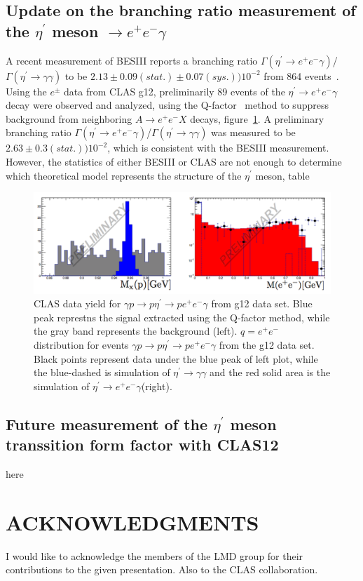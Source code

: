 \documentclass{aip-cp}
\begin{document}
\subsection{Update on the branching ratio measurement  of the $\eta^\prime$ meson $\rightarrow e^+e^-\gamma$}
A recent measurement of BESIII reports a branching ratio $\Gamma(\eta^{\prime} \to  e^+ e^-  \gamma)$/$\Gamma(\eta^{\prime} \to  \gamma  \gamma)$ to be $2.13\pm0.09(stat.)\pm0.07(sys.))10^{-2}$ from 864 events~\cite{bib7}.  Using the $e^{\pm}$ data from CLAS g12, preliminarily 89 events of the $\eta^{\prime} \to  e^+ e^-  \gamma$ decay were observed and analyzed, using the Q-factor~\cite{bib8} method to suppress background from neighboring $A \to e^+ e^-  X$ decays, figure~\ref{fig:etaP_ff}. A preliminary branching ratio $\Gamma(\eta^{\prime} \to  e^+ e^-  \gamma)$/$\Gamma(\eta^{\prime} \to  \gamma  \gamma)$ was measured to be $2.63\pm0.3(stat.))10^{-2}$, which is consistent with the BESIII measurement. However, the statistics of either BESIII or CLAS are not enough to determine which theoretical model represents the structure of the $\eta^{\prime}$ meson, table~
 \begin{figure}[h!]
 	\centerline{\includegraphics[width=400 pt, height=150 pt]{figures/clas_etaP_ff.pdf}}
 	\caption{CLAS data yield for $\gamma p \to p \eta^{\prime}  \to p e^+ e^- \gamma $ from g12 data set. Blue peak represtns the signal extracted using the Q-factor method, while the gray band represents the background (left). $q=e^+ e^-$ distribution for events  $\gamma p \to p \eta^{\prime}  \to p e^+ e^- \gamma $ from the g12 data set. Black points represent data under the blue peak of left plot, while the blue-dashed is simulation of $\eta^{\prime} \to  \gamma  \gamma$ and the red solid area is the simulation of $\eta^{\prime} \to  e^+ e^-  \gamma$(right).}
 	\label{fig:etaP_ff}
 \end{figure}
\subsection{Future measurement of the $\eta^\prime$ meson transsition form factor with CLAS12}
here
\section{ACKNOWLEDGMENTS}
I would like to acknowledge the members of the LMD group for their contributions to the given presentation. Also to the CLAS collaboration.


\nocite{*}
%
%
\end{document}

